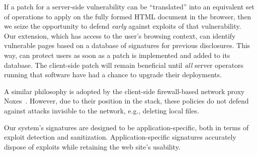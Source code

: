 If a patch for a server-side vulnerability can be ``translated'' into
an equivalent set of operations to apply on the fully formed HTML
document in the browser, then we seize the opportunity to defend
{\em early} against exploits of that vulnerability.
%
Our extension, which has access to the user's browsing context, can
identify vulnerable pages based on a database of signatures for
previous disclosures. This way, \sys can protect users as soon as a patch
is implemented and added to its database. The client-side
patch will remain beneficial until \textit{all} server
operators running that software have had a chance to upgrade their
deployments. 


A similar philosophy is adopted by the client-side firewall-based network 
proxy Noxes~\cite{Kirda:2009:CCS:2639535.2639808}. 
However, due to their position in the stack, these policies do not defend against 
attacks invisible to the network, e.g., deleting local files.

Our system's signatures are designed to be application-specific, both
in terms of exploit detection and sanitization. %
Application-specific signatures accurately dispose
of exploits while retaining the web site's usability.






